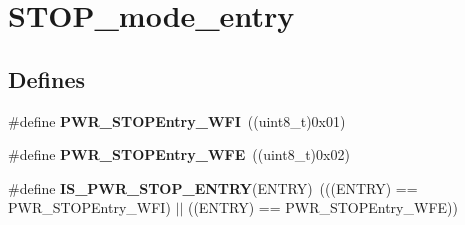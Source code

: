 \hypertarget{group__STOP__mode__entry}{
\section{STOP\_\-mode\_\-entry}
\label{group__STOP__mode__entry}
}
\subsection*{Defines}
\begin{DoxyCompactItemize}
\item 
\hypertarget{group__STOP__mode__entry_gaa1e1362f3d0b93e8f5f674e18cfc96c4}{
\#define {\bfseries PWR\_\-STOPEntry\_\-WFI}~((uint8\_\-t)0x01)}
\label{group__STOP__mode__entry_gaa1e1362f3d0b93e8f5f674e18cfc96c4}

\item 
\hypertarget{group__STOP__mode__entry_gaac98ac55fb8764121d4168d99c9b369e}{
\#define {\bfseries PWR\_\-STOPEntry\_\-WFE}~((uint8\_\-t)0x02)}
\label{group__STOP__mode__entry_gaac98ac55fb8764121d4168d99c9b369e}

\item 
\hypertarget{group__STOP__mode__entry_ga4a94eb1f400dec6e486fbc229cbea8a0}{
\#define {\bfseries IS\_\-PWR\_\-STOP\_\-ENTRY}(ENTRY)~(((ENTRY) == PWR\_\-STOPEntry\_\-WFI) $|$$|$ ((ENTRY) == PWR\_\-STOPEntry\_\-WFE))}
\label{group__STOP__mode__entry_ga4a94eb1f400dec6e486fbc229cbea8a0}

\end{DoxyCompactItemize}
